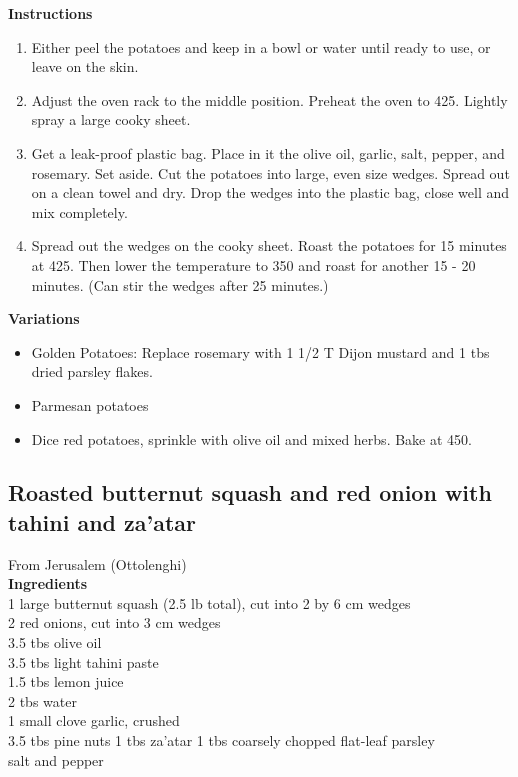 \documentclass{article}
\numberwithin{figure}{section}
\numberwithin{equation}{section}
\begin{document}
{\bf Instructions}
\begin{enumerate}
\item Either peel the potatoes and keep in a bowl or water until ready to use, or leave on the skin.
\item Adjust the oven rack to the middle position.   Preheat the oven to 425.  Lightly spray a large cooky sheet.
\item Get a leak-proof plastic bag.  Place in it the olive oil, garlic, salt, pepper, and rosemary.  Set aside.  Cut the potatoes into large, even size wedges.  Spread out on a clean towel and dry.  Drop the wedges into the plastic bag, close well and mix completely.
\item Spread out the wedges on the cooky sheet.  Roast the potatoes for 15 minutes at 425.  Then lower the temperature to 350 and roast for another 15 - 20 minutes.  (Can stir the wedges after 25 minutes.)
\end{enumerate}

{\bf Variations}
\begin{itemize}
\item Golden Potatoes:  Replace rosemary with 1 1/2 T Dijon mustard and 1 tbs dried parsley flakes.
\item Parmesan potatoes
\item Dice red potatoes, sprinkle with olive oil and mixed herbs.  Bake at 450.
\end{itemize}


\pagebreak
\subsection{Roasted butternut squash and red onion with tahini and za'atar}
From Jerusalem (Ottolenghi)\\

{\bf Ingredients}\\
1 large butternut squash (2.5 lb total), cut into 2 by 6 cm wedges\\
2 red onions, cut into 3 cm wedges\\
3.5 tbs olive oil\\
3.5 tbs light tahini paste\\
1.5 tbs lemon juice\\
2 tbs water\\
1 small clove garlic, crushed\\
3.5 tbs pine nuts
1 tbs za'atar
1 tbs coarsely chopped flat-leaf parsley\\
salt and pepper\\
\end{document}
